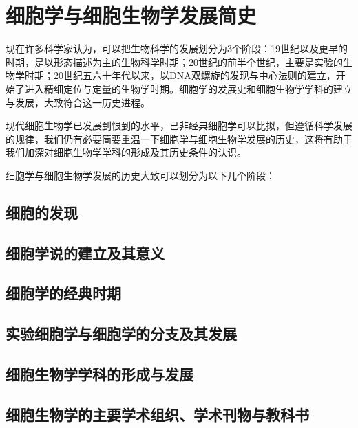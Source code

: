 \section{细胞学与细胞生物学发展简史}

现在许多科学家认为，可以把生物科学的发展划分为3个阶段：19世纪以及更早的时期，是以形态描述为主的生物科学时期；20世纪的前半个世纪，主要是实验的生物学时期；20世纪五六十年代以来，以DNA双螺旋的发现与中心法则的建立，开始了进入精细定位与定量的生物学时期。细胞学的发展史和细胞生物学学科的建立与发展，大致符合这一历史进程。

现代细胞生物学已发展到恨到的水平，已非经典细胞学可以比拟，但遵循科学发展的规律，我们仍有必要简要重温一下细胞学与细胞生物学发展的历史，这将有助于我们加深对细胞生物学学科的形成及其历史条件的认识。

细胞学与细胞生物学发展的历史大致可以划分为以下几个阶段：

\subsection{细胞的发现}


\subsection{细胞学说的建立及其意义}

\subsection{细胞学的经典时期}

\subsection{实验细胞学与细胞学的分支及其发展}

\subsection{细胞生物学学科的形成与发展}

\subsection{细胞生物学的主要学术组织、学术刊物与教科书}









